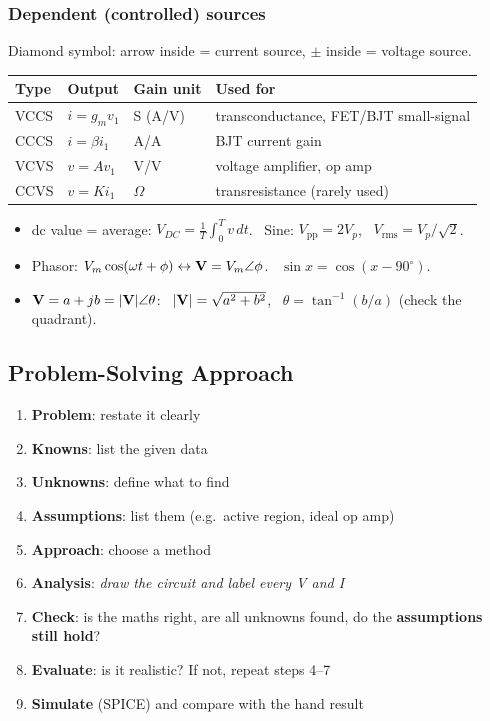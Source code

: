     \subsubsection{Dependent (controlled) sources}
    Diamond symbol: arrow inside = current source, $\pm$ inside = voltage source.\\
    \begin{tabularx}{\linewidth}{|l|l|l|L|}
        \hline
        \textbf{Type} & \textbf{Output} & \textbf{Gain unit} & \textbf{Used for} \\ \hline
        VCCS & $i = g_m v_1$ & S (A/V) & transconductance, FET/BJT small-signal \\ \hline
        CCCS & $i = \beta i_1$ & A/A & BJT current gain \\ \hline
        VCVS & $v = A v_1$ & V/V & voltage amplifier, op amp \\ \hline
        CCVS & $v = K i_1$ & $\Omega$ & transresistance (rarely used) \\ \hline
    \end{tabularx}

    \begin{handy}
        \begin{itemize}
            \item dc value = average: $V_{DC} = \frac1T\int_0^T v\,dt$. \ Sine: $V_{\mathrm{pp}} = 2V_p$, \ $V_{\mathrm{rms}} = V_p/\sqrt2$.
            \item Phasor: $V_m\cos(\omega t+\phi) \leftrightarrow \mathbf{V} = V_m\angle\phi$. \ $\sin x = \cos(x - 90^\circ)$.
            \item $\mathbf{V} = a + jb = |\mathbf{V}|\angle\theta$: \ $|\mathbf{V}| = \sqrt{a^2+b^2}$, \ $\theta = \tan^{-1}(b/a)$ (check the quadrant).
        \end{itemize}
    \end{handy}

    \subsection[1.4]{Problem-Solving Approach}
    \begin{enumerate}
        \item \textbf{Problem}: restate it clearly
        \item \textbf{Knowns}: list the given data
        \item \textbf{Unknowns}: define what to find
        \item \textbf{Assumptions}: list them (e.g.\ active region, ideal op amp)
        \item \textbf{Approach}: choose a method
        \item \textbf{Analysis}: \textit{draw the circuit and label every V and I}
        \item \textbf{Check}: is the maths right, are all unknowns found, do the \textbf{assumptions still hold}?
        \item \textbf{Evaluate}: is it realistic? If not, repeat steps 4--7
        \item \textbf{Simulate} (SPICE) and compare with the hand result
    \end{enumerate}

